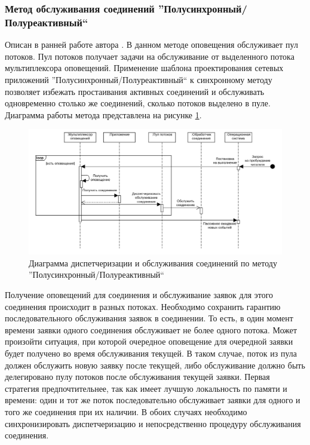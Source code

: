 \subsubsection{Метод обслуживания соединений ''Полусинхронный/Полуреактивный``}\label{chapter31:BlockingHSHA}
Описан в ранней работе автора \cite{GubarevKMU20}.
В данном методе оповещения обслуживает пул потоков. Пул потоков получает задачи на обслуживание от выделенного потока мультиплексора оповещений. Применение шаблона проектирования сетевых приложений ''Полусинхронный/Полуреактивный`` \cite{schmidt1995half} к синхронному методу позволяет избежать простаивания активных соединений и обслуживать одновременно столько же соединений, сколько потоков выделено в пуле. Диаграмма работы метода представлена на рисунке \ref{chapter31:HSHAMuxSchema}.

\begin{figure}[!h]
\caption{Диаграмма диспетчеризации и обслуживания соединений по методу ''Полусинхронный/Полуреактивный``}
\label{chapter31:HSHAMuxSchema}
\includegraphics[width=\textwidth]{../../graphics/schemes/HSHAMuxSequence}
\end{figure}

Получение оповещений для соединения и обслуживание заявок для этого соединения происходит в разных потоках. Необходимо сохранить гарантию последовательного обслуживания заявок в соединении. То есть, в один момент времени заявки одного соединения обслуживает не более одного потока. Может произойти ситуация, при которой очередное оповещение для очередной заявки будет получено во время обслуживания текущей. В таком случае, поток из пула должен обслужить новую заявку после текущей, либо обслуживание должно быть делегировано пулу потоков после обслуживания текущей заявки. Первая стратегия предпочтительнее, так как имеет лучшую локальность по памяти и времени: один и тот же поток последовательно обслуживает заявки для одного и того же соединения при их наличии. В обоих случаях необходимо синхронизировать диспетчеризацию и непосредственно процедуру обслуживания соединения.

